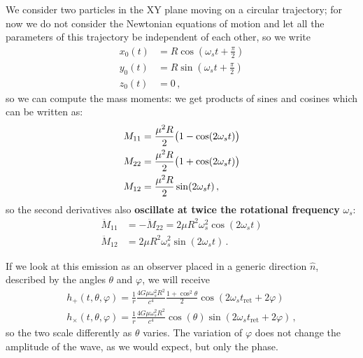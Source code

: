 \documentclass[main.tex]{subfiles}
\begin{document}
We consider two particles in the XY plane moving on a circular trajectory; for now we do not consider the Newtonian equations of motion and let all the parameters of this trajectory be independent of each other, so we write 
%
\begin{subequations}
\begin{align}
x_0 (t) &= R \cos(\omega_{s} t + \frac{\pi}{2}) \\
y_0 (t) &= R \sin(\omega_{s} t + \frac{\pi}{2}) \\
z_0 (t) &= 0
\,,
\end{align}
\end{subequations}
%
so we can compute the mass moments: we get products of sines and cosines which can be written as:
%
\begin{align}
M_{11} &= \frac{\mu^2R}{2} \qty(1 - \cos(2 \omega_{s}t)) \\
M_{22} &= \frac{\mu^2R}{2} \qty(1 + \cos(2 \omega_{s}t)) \\
M_{12} &= \frac{\mu^2R}{2} \sin(2 \omega_{s}t) 
\,,
\end{align}
%
so the second derivatives also \textbf{oscillate at twice the rotational frequency} \(\omega_{s}\):
%
\begin{subequations}
\begin{align}
\ddot{M}_{11} &= - \ddot{M}_{22} = 2 \mu R^2 \omega_{s}^2 \cos(2 \omega_{s}t)  \\
\ddot{M}_{12} &= 2 \mu R^2\omega_{s}^2  \sin( 2 \omega_{s}t)
\,.
\end{align}
\end{subequations}

If we look at this emission as an observer placed in a generic direction \(\hat{n}\), described by the angles \(\theta \) and \(\varphi \), we will receive 
%
\begin{subequations}
\begin{align}
h_{+} (t, \theta , \varphi ) = \frac{1}{r} \frac{4G \mu \omega_{s}^2 R^2}{c^{4}} \frac{1 + \cos^2\theta }{2} \cos(2 \omega_{s}t _{\text{ret}} + 2 \varphi  ) \\
h_{ \times } (t, \theta , \varphi ) = \frac{1}{r} \frac{4G \mu \omega_{s}^2 R^2}{c^{4}} \cos(\theta ) \sin(2 \omega_{s}t _{\text{ret}} + 2 \varphi  )
\,,
\end{align}
\end{subequations}
%
so the two scale differently as \(\theta \) varies.
The variation of \(\varphi \) does not change the amplitude of the wave, as we would expect, but only the phase.
\end{document}
